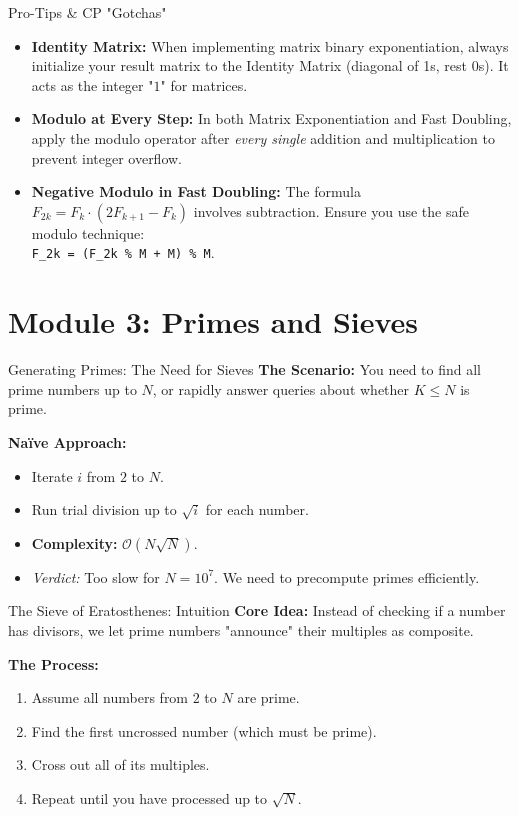 \documentclass[aspectratio=169]{beamer}
\begin{document}
\begin{frame}{Pro-Tips \& CP "Gotchas"}
    \begin{itemize}
        \item \textbf{Identity Matrix:} When implementing matrix binary exponentiation, always initialize your result matrix to the Identity Matrix (diagonal of 1s, rest 0s). It acts as the integer "$1$" for matrices.
        \item \textbf{Modulo at Every Step:} In both Matrix Exponentiation and Fast Doubling, apply the modulo operator after \textit{every single} addition and multiplication to prevent integer overflow.
        \item \textbf{Negative Modulo in Fast Doubling:} The formula $F_{2k} = F_k \cdot (2F_{k+1} - F_k)$ involves subtraction. Ensure you use the safe modulo technique: \\
        \texttt{F\_2k = (F\_2k \% M + M) \% M}.
    \end{itemize}
\end{frame}

\section{Module 3: Primes and Sieves}

\begin{frame}{Generating Primes: The Need for Sieves}
    \textbf{The Scenario:} 
    You need to find all prime numbers up to $N$, or rapidly answer queries about whether $K \le N$ is prime.
    
    \vspace{0.3cm}
    \textbf{Naïve Approach:}
    \begin{itemize}
        \item Iterate $i$ from $2$ to $N$.
        \item Run trial division up to $\sqrt{i}$ for each number.
        \item \textbf{Complexity:} $\mathcal{O}(N \sqrt{N})$.
        \item \textit{Verdict:} Too slow for $N = 10^7$. We need to precompute primes efficiently.
    \end{itemize}
\end{frame}

\begin{frame}{The Sieve of Eratosthenes: Intuition}
    \textbf{Core Idea:} Instead of checking if a number has divisors, we let prime numbers "announce" their multiples as composite.
    
    
    
    \vspace{0.3cm}
    \textbf{The Process:}
    \begin{enumerate}
        \item Assume all numbers from $2$ to $N$ are prime.
        \item Find the first uncrossed number (which must be prime).
        \item Cross out all of its multiples.
        \item Repeat until you have processed up to $\sqrt{N}$.
    \end{enumerate}
\end{frame}
\end{document}
